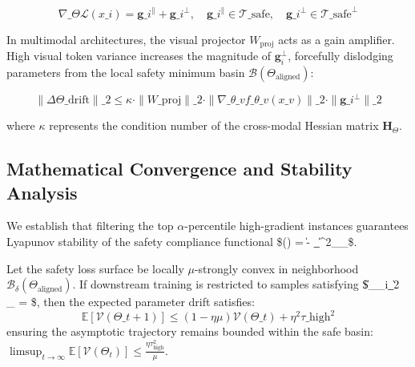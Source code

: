 \documentclass[10pt,twocolumn,letterpaper]{article}
\begin{document}
\begin{table}[t]
\begin{equation}
\label{eq:grad\_decomposition}
\nabla\_\Theta \mathcal{L}(x\_i) = \mathbf{g}\_i^{\parallel} + \mathbf{g}\_i^{\perp}, \quad \mathbf{g}\_i^{\parallel} \in \mathcal{T}\_{\text{safe}}, \quad \mathbf{g}\_i^{\perp} \in \mathcal{T}\_{\text{safe}}^{\perp}
\end{equation}

In multimodal architectures, the visual projector $W_{\text{proj}}$ acts as a gain amplifier. High visual token variance increases the magnitude of $\mathbf{g}_i^{\perp}$, forcefully dislodging parameters from the local safety minimum basin $\mathcal{B}(\Theta_{\text{aligned}})$:

\begin{equation}
\label{eq:reversion\_bound}
\|\Delta \Theta\_{\text{drift}}\|\_2 \le \kappa \cdot \|W\_{\text{proj}}\|\_2 \cdot \|\nabla\_{\theta\_v} f\_{\theta\_v}(x\_v)\|\_2 \cdot \|\mathbf{g}\_i^{\perp}\|\_2
\end{equation}

where $\kappa$ represents the condition number of the cross-modal Hessian matrix $\mathbf{H}_{\Theta}$.


\subsection{Mathematical Convergence and Stability Analysis}

We establish that filtering the top $\alpha$-percentile high-gradient instances guarantees Lyapunov stability of the safety compliance functional \$(\Theta) = \|\Theta - \Theta\_{}\|^2\_{\_{}}\$.

Let the safety loss surface be locally $\mu$-strongly convex in neighborhood $\mathcal{B}_\delta(\Theta_{\text{aligned}})$. If downstream training is restricted to samples satisfying \$\|\nabla\_\Theta {}\_i\|\_2 \le \tau\_{} = \sqrt{2\mu \epsilon}\$, then the expected parameter drift satisfies:
\begin{equation}
\label{eq:lyapunov\_bound}
\mathbb{E}\left[ \mathcal{V}(\Theta\_{t+1}) \right] \le (1 - \eta \mu) \mathcal{V}(\Theta\_t) + \eta^2 \tau\_{\text{high}}^2
\end{equation}
ensuring the asymptotic trajectory remains bounded within the safe basin: $\limsup_{t \to \infty} \mathbb{E}[\mathcal{V}(\Theta_t)] \le \frac{\eta \tau_{\text{high}}^2}{\mu}$.





\end{table}
\end{document}
